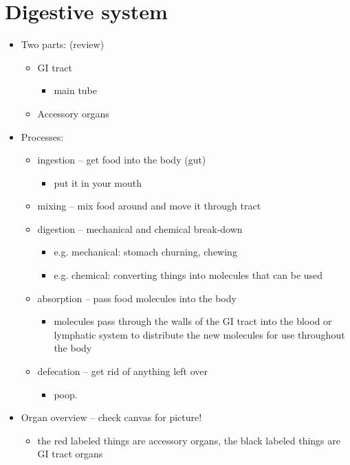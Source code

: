 \documentclass{article}
\theoremstyle{definition}
\begin{document}
\section{Digestive system}
\begin{itemize}
	\item Two parts: (review)
		\begin{itemize}
			\item GI tract
				\begin{itemize}
					\item main tube
				\end{itemize}
			\item Accessory organs
		\end{itemize}
	\item Processes:
		\begin{itemize}
			\item ingestion -- get food into the body (gut)
				\begin{itemize}
					\item put it in your mouth
				\end{itemize}
			\item mixing -- mix food around and move it through tract
			\item digestion -- mechanical and chemical break-down
				\begin{itemize}
					\item e.g. mechanical: stomach churning, chewing
					\item e.g. chemical: converting things into molecules that can be used
				\end{itemize}
			\item absorption -- pass food molecules into the body
				\begin{itemize}
					\item molecules pass through the walls of the GI tract into the blood or lymphatic system to distribute the new molecules for use throughout the body
				\end{itemize}
			\item defecation -- get rid of anything left over
				\begin{itemize}
					\item poop.
				\end{itemize}
		\end{itemize}
	\item Organ overview -- check canvas for picture!
		\begin{itemize}
			\item the red labeled things are accessory organs, the black labeled things are GI tract organs

\end{itemize}
\end{itemize}
\end{document}
